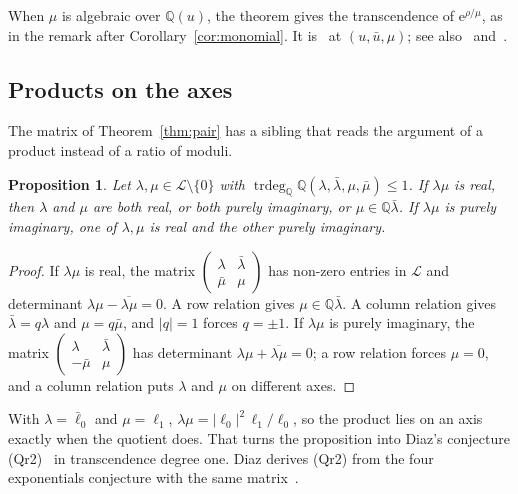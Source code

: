 \documentclass[11pt,a4paper]{article}
\theoremstyle{plain}
\newtheorem{proposition}[theorem]{Proposition}
\theoremstyle{definition}
\newcommand{\e}{\mathrm{e}}
\newcommand{\Q}{\mathbb{Q}}
\newcommand{\Logs}{\mathcal{L}}
\DeclareMathOperator{\trdeg}{trdeg}
\begin{document}
When $\mu$ is algebraic over $\Q(u)$, the theorem gives the transcendence of $\e^{\rho/\mu}$, as in the
remark after Corollary~\ref{cor:monomial}. It is~\cite[Corollaire~4]{waldschmidt-1973} at
$(u,\bar u,\mu)$; see also~\cite[Exercise~7.4.d]{waldschmidt-1974}
and~\cite[Corollary~1.2(c)]{roy-waldschmidt-1997}.

\subsection*{Products on the axes}

The matrix of Theorem~\ref{thm:pair} has a sibling that reads the argument of a product instead of a
ratio of moduli.

\begin{proposition}\label{prop:axis-products}
Let $\lambda,\mu\in\Logs\setminus\{0\}$ with $\trdeg_{\Q}\Q(\lambda,\bar\lambda,\mu,\bar\mu)\le1$. If
$\lambda\mu$ is real, then $\lambda$ and $\mu$ are both real, or both purely imaginary, or
$\mu\in\Q\bar\lambda$. If $\lambda\mu$ is purely imaginary, one of $\lambda,\mu$ is real and the
other purely imaginary.
\end{proposition}

\begin{proof}
If $\lambda\mu$ is real, the matrix $\begin{pmatrix}\lambda&\bar\lambda\\ \bar\mu&\mu\end{pmatrix}$
has non-zero entries in $\Logs$ and determinant $\lambda\mu-\overline{\lambda\mu}=0$. A row relation
gives $\mu\in\Q\bar\lambda$. A column relation gives $\bar\lambda=q\lambda$ and $\mu=q\bar\mu$, and
$|q|=1$ forces $q=\pm1$. If $\lambda\mu$ is purely imaginary, the matrix
$\begin{pmatrix}\lambda&\bar\lambda\\ -\bar\mu&\mu\end{pmatrix}$ has determinant
$\lambda\mu+\overline{\lambda\mu}=0$; a row relation forces $\mu=0$, and a column relation puts
$\lambda$ and $\mu$ on different axes.
\end{proof}

With $\lambda=\bar\ell_{0}$ and $\mu=\ell_{1}$, $\lambda\mu=|\ell_{0}|^{2}\,\ell_{1}/\ell_{0}$, so the
product lies on an axis exactly when the quotient does. That turns the proposition into Diaz's
conjecture (Qr2)~\cite[p.~376]{diaz-2007} in transcendence degree one. Diaz derives (Qr2) from the
four exponentials conjecture with the same matrix~\cite[p.~377]{diaz-2007}.
\end{document}
